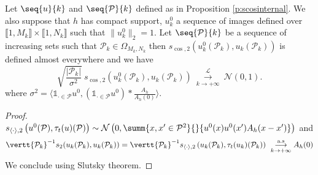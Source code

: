\begin{prop}
  Let $\seq{u}{k}$ and $\seq{\mathcal{P}}{k}$ defined as in Proposition \ref{p:scosinternal}.
We  also suppose that $h$ has compact support, $u_{k}^0$ a sequence of
  images defined over $\llbracket 1,M_k \rrbracket \times \llbracket 1,N_k \rrbracket$ such that $\| u_k^0 \|_2 =
  1$. Let $\seq{\mathcal{P}}{k}$ be a sequence of increasing sets such that
  $\mathcal{P}_k \in \Omega_{M_k,N_k}$ then
  $s_{\cos,2}(u_k^0(\mathcal{P}_k), u_k(\mathcal{P}_k))$ is
  defined almost everywhere and we have
  \[
    \sqrt{\frac{\vert \mathcal{P}_k \vert}{\sigma^2}} \ s_{\cos,2}(u_k^0(\mathcal{P}_k), u_k(\mathcal{P}_k)) \
    \overset{\mathcal{L}}{\underset{k \rightarrow +\infty}{\longrightarrow}} \
    \mathcal{N}(0,1).
  \]
  where
  $\sigma^2 = \langle \mathbb{1}_{\cdot \in \mathcal{P}}u^0,
  \left(\mathbb{1}_{\cdot \in \mathcal{P}}u^0\right) * \frac{A_h}{A_h(0)}\rangle$.
  \label{p:scostemplate}
\end{prop}
\begin{proof}
  $s_{\langle \cdot \rangle, 2}\left( u^0(\mathcal{P}),
    \tau_t(u)(\mathcal{P})\right) \sim \mathcal{N}\left(0,\summ{x,x' \in
      \mathcal{P}^2}{}{u^0(x)u^0(x')A_h(x-x')} \right)$ and
  \[\vertt{\mathcal{P}_k}^{-1}
    s_{2}(u_k(\mathcal{P}_k),u_k(\mathcal{P}_k)) =
    \vertt{\mathcal{P}_k}^{-1} s_{\langle \cdot
      \rangle,2}\left(u_k(\mathcal{P}_k),
      \tau_t(u_k)(\mathcal{P}_k) \right) \ \underset{k
      \rightarrow +\infty}{\overset{\text{a.s}}{\longrightarrow}} A_h(0)\] We
  conclude using Slutsky theorem.
\end{proof}
